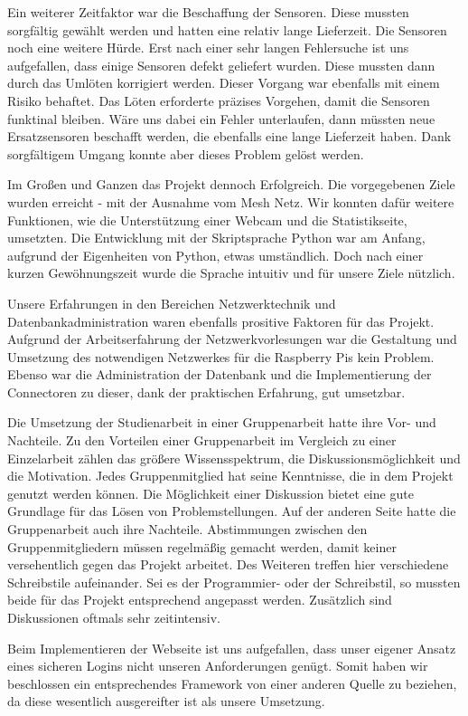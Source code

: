 	Ein weiterer Zeitfaktor war die Beschaffung der Sensoren. Diese mussten sorgfältig gewählt werden und hatten eine relativ lange Lieferzeit.
	Die Sensoren noch eine weitere Hürde. Erst nach einer sehr langen Fehlersuche ist uns aufgefallen, dass einige Sensoren defekt geliefert wurden. Diese mussten dann durch das Umlöten korrigiert werden. Dieser Vorgang war ebenfalls mit einem Risiko behaftet. Das Löten erforderte präzises Vorgehen, damit die Sensoren funktinal bleiben. Wäre uns dabei ein Fehler unterlaufen, dann müssten neue Ersatzsensoren beschafft werden, die ebenfalls eine lange Lieferzeit haben. Dank sorgfältigem Umgang konnte aber dieses Problem gelöst werden.
	
	Im Großen und Ganzen das Projekt dennoch Erfolgreich. Die vorgegebenen Ziele wurden erreicht - mit der Ausnahme vom Mesh Netz. Wir konnten dafür weitere Funktionen, wie die Unterstützung einer Webcam und die Statistikseite, umsetzten. Die Entwicklung mit der Skriptsprache Python war am Anfang, aufgrund der Eigenheiten von Python, etwas umständlich. Doch nach einer kurzen Gewöhnungszeit wurde die Sprache intuitiv und für unsere Ziele nützlich.
	
	Unsere Erfahrungen in den Bereichen Netzwerktechnik und Datenbankadministration waren ebenfalls prositive Faktoren für das Projekt.
	Aufgrund der Arbeitserfahrung der Netzwerkvorlesungen war die Gestaltung und Umsetzung des notwendigen Netzwerkes für die Raspberry Pis kein Problem.  
	Ebenso war die Administration der Datenbank und die Implementierung der Connectoren zu dieser, dank der praktischen Erfahrung, gut umsetzbar.
	
	Die Umsetzung der Studienarbeit in einer Gruppenarbeit hatte ihre Vor- und Nachteile. Zu den Vorteilen einer Gruppenarbeit im Vergleich zu einer Einzelarbeit zählen das größere Wissensspektrum, die Diskussionsmöglichkeit und die Motivation. Jedes Gruppenmitglied hat seine Kenntnisse, die in dem Projekt genutzt werden können. Die Möglichkeit einer Diskussion bietet eine gute Grundlage für das Lösen von Problemstellungen. Auf der anderen Seite hatte die Gruppenarbeit auch ihre Nachteile. Abstimmungen zwischen den Gruppenmitgliedern müssen regelmäßig gemacht werden, damit keiner versehentlich gegen das Projekt arbeitet. Des Weiteren treffen hier verschiedene Schreibstile aufeinander. Sei es der Programmier- oder der Schreibstil, so mussten beide für das Projekt entsprechend angepasst werden. Zusätzlich sind Diskussionen oftmals sehr zeitintensiv.
	
	Beim Implementieren der Webseite ist uns aufgefallen, dass unser eigener Ansatz eines sicheren Logins nicht unseren Anforderungen genügt. Somit haben wir beschlossen ein entsprechendes Framework von einer anderen Quelle zu beziehen, da diese wesentlich ausgereifter ist als unsere Umsetzung. 
	
